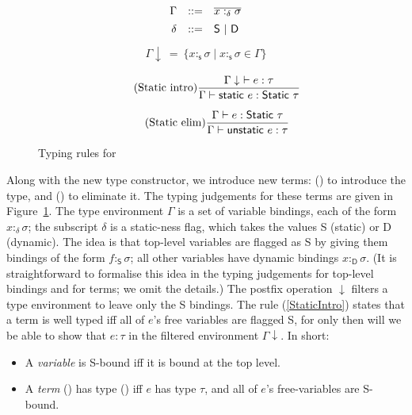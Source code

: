 \documentclass[preprint]{sigplanconf}
\begin{document}
\begin{figure}[t!]
\begin{minipage}{\linewidth}
$$
\begin{array}{rcl}
\Gamma & ::= & \overline{x :_{\delta} \sigma} \\[1ex]
     \delta & ::= & \mbox{{\sf S}} ~|~ \mbox{{\sf D}}
\end{array}
$$
\begin{align*}
\Gamma\downarrow ~=~ \{ x:_{\textsf{s}} \sigma \mid x :_{\textsf{s}} \sigma \in \Gamma \}
\end{align*}

\begin{equation*}
\tag{Static~intro}\label{StaticIntro}
\frac{\Gamma\downarrow~\vdash e : \tau}
     {\Gamma \vdash \textsf{static}~e : \textsf{Static}~\tau}
\end{equation*}

\begin{equation*}
\tag{Static~elim}\label{StaticElim}
\frac{\Gamma \vdash e : \textsf{Static}~\tau}
     {\Gamma \vdash \textsf{unstatic}~e : \tau}
\end{equation*}
\end{minipage}
\caption{Typing rules for } \label{fig:static}
\end{figure}
Along with the new type constructor, we introduce new terms:
($\!$) to introduce the type, and 
($\!$) to eliminate it.
The typing judgements for these terms are given in Figure~\ref{fig:static}.
The type environment $\Gamma$ is a set of variable bindings, each of the form $x :_{\delta} \sigma$;
the subscript $\delta$ is a static-ness flag, which takes the values \textsf{S} (static) or
\textsf{D} (dynamic).  The idea is that top-level variables are flagged as \textsf{S} by giving them bindings
of the form $f\! :_{\textsf{S}}\! \sigma$; all other variables have dynamic bindings 
$x\! :_{\textsf{D}}\!\sigma$.
(It is straightforward to formalise this idea in the typing judgements for top-level
bindings and for terms; we omit the details.)
The postfix operation $\downarrow$ filters a type environment
to leave only the
\textsf{S} bindings.
The rule (\ref{StaticIntro}) states that a term  is well typed iff all of $e$'s free variables are flagged \textsf{S}, for only then will we be able to show that $e : \tau$ in the filtered environment $\Gamma \downarrow$.  In short:
\begin{itemize}
\item A \emph{variable} is \textsf{S}-bound iff it is bound at the top level.
\item A \emph{term} ($\!$) has type ($\!$) iff 
$e$ has type $\tau$, and all of $e$'s free-variables are \textsf{S}-bound.  
\end{itemize}
\end{document}
